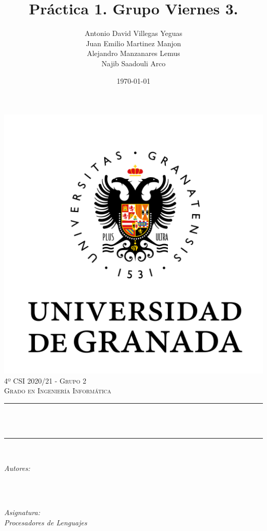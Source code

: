 \documentclass[12pt, spanish]{article}
\title{Práctica 1. Grupo Viernes 3.\\
  \hspace{0.05cm} }
\author{Antonio David Villegas Yeguas\\
		Juan Emilio Martinez Manjon\\
		Alejandro Manzanares Lemus\\
		Najib Saadouli Arco}
\date{\today}
\makeatletter
\let\thetitle\@title
\let\theauthor\@author
\makeatother
\begin{document}

\begin{titlepage}
    \centering
    \vspace*{0.3 cm}
    \includegraphics[scale = 0.50]{ugr.png}\\[0.7 cm]
    \textsc{\large 4º CSI 2020/21 - Grupo 2}\\[0.5 cm]
    \textsc{\large Grado en Ingeniería Informática}\\[0.5 cm]
    \rule{\linewidth}{0.2 mm} \\[0.2 cm]
    { \huge \bfseries \thetitle}\\
    \rule{\linewidth}{0.2 mm} \\[1 cm]

    \begin{minipage}{0.4\textwidth}
        \begin{flushleft} \large
            \emph{Autores:}\\
            \theauthor\\
            \end{flushleft}
            \end{minipage}~
            \begin{minipage}{0.4\textwidth}
            \begin{flushright} \large
            \emph{Asignatura: \\
            Procesadores de Lenguajes}   \\


\end{flushright}
\end{minipage}
\end{titlepage}
\end{document}
